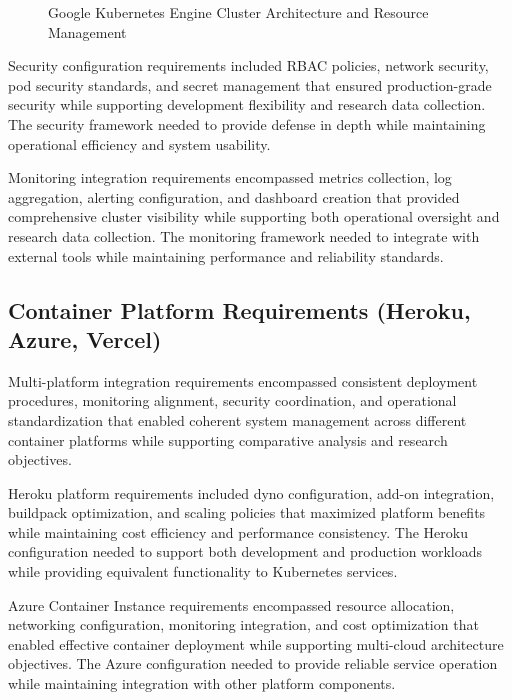 \begin{figure}[H]
\centering
\caption{Google Kubernetes Engine Cluster Architecture and Resource Management}
\label{fig:gke-cluster-architecture}
\end{figure}

Security configuration requirements included RBAC policies, network security, pod security standards, and secret management that ensured production-grade security while supporting development flexibility and research data collection. The security framework needed to provide defense in depth while maintaining operational efficiency and system usability.

Monitoring integration requirements encompassed metrics collection, log aggregation, alerting configuration, and dashboard creation that provided comprehensive cluster visibility while supporting both operational oversight and research data collection. The monitoring framework needed to integrate with external tools while maintaining performance and reliability standards.

\subsection{Container Platform Requirements (Heroku, Azure, Vercel)}

Multi-platform integration requirements encompassed consistent deployment procedures, monitoring alignment, security coordination, and operational standardization that enabled coherent system management across different container platforms while supporting comparative analysis and research objectives.

Heroku platform requirements included dyno configuration, add-on integration, buildpack optimization, and scaling policies that maximized platform benefits while maintaining cost efficiency and performance consistency. The Heroku configuration needed to support both development and production workloads while providing equivalent functionality to Kubernetes services.

Azure Container Instance requirements encompassed resource allocation, networking configuration, monitoring integration, and cost optimization that enabled effective container deployment while supporting multi-cloud architecture objectives. The Azure configuration needed to provide reliable service operation while maintaining integration with other platform components.

